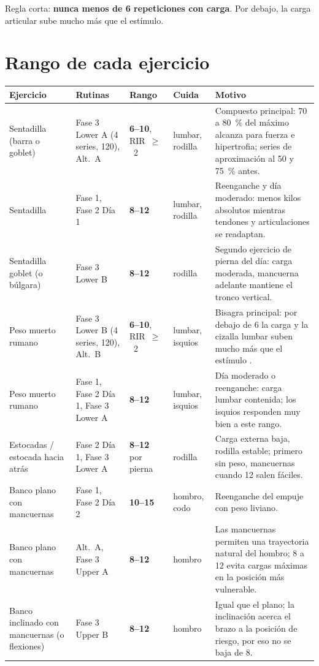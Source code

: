 \documentclass[11pt,a4paper]{article}
\newcommand{\rango}[1]{\textbf{#1}}
\newcommand{\seg}{\textquotedbl}
\begin{document}
Regla corta: \textbf{nunca menos de 6 repeticiones con carga}. Por debajo, la carga articular sube mucho más que el estímulo.

\section{Rango de cada ejercicio}

\begin{longtable}{L{3.0cm} L{3.0cm} L{2.1cm} L{2.0cm} L{4.8cm}}
\toprule
\textbf{Ejercicio} & \textbf{Rutinas} & \textbf{Rango} & \textbf{Cuida} & \textbf{Motivo} \\
\midrule
\endhead
Sentadilla (barra o goblet) & Fase 3 Lower A (4 series, 120\seg), Alt.\ A & \rango{6--10}, RIR~$\geq$~2 & lumbar, rodilla & Compuesto principal: 70 a 80~\% del máximo alcanza para fuerza e hipertrofia; series de aproximación al 50 y 75~\% antes. \\
Sentadilla & Fase 1, Fase 2 Día 1 & \rango{8--12} & lumbar, rodilla & Reenganche y día moderado: menos kilos absolutos mientras tendones y articulaciones se readaptan. \\
Sentadilla goblet (o búlgara) & Fase 3 Lower B & \rango{8--12} & rodilla & Segundo ejercicio de pierna del día: carga moderada, mancuerna adelante mantiene el tronco vertical. \\
Peso muerto rumano & Fase 3 Lower B (4 series, 120\seg), Alt.\ B & \rango{6--10}, RIR~$\geq$~2 & lumbar, isquios & Bisagra principal: por debajo de 6 la carga y la cizalla lumbar suben mucho más que el estímulo \cite{cholewicki1991}. \\
Peso muerto rumano & Fase 1, Fase 2 Día 1, Fase 3 Lower A & \rango{8--12} & lumbar, isquios & Día moderado o reenganche: carga lumbar contenida; los isquios responden muy bien a este rango. \\
Estocadas / estocada hacia atrás & Fase 2 Día 1, Fase 3 Lower A & \rango{8--12} por pierna & rodilla & Carga externa baja, rodilla estable; primero sin peso, mancuernas cuando 12 salen fáciles. \\
Banco plano con mancuernas & Fase 1, Fase 2 Día 2 & \rango{10--15} & hombro, codo & Reenganche del empuje con peso liviano. \\
Banco plano con mancuernas & Alt.\ A, Fase 3 Upper A & \rango{8--12} & hombro & Las mancuernas permiten una trayectoria natural del hombro; 8 a 12 evita cargas máximas en la posición más vulnerable. \\
Banco inclinado con mancuernas (o flexiones) & Fase 3 Upper B & \rango{8--12} & hombro & Igual que el plano; la inclinación acerca el brazo a la posición de riesgo, por eso no se baja de 8. \\

\end{longtable}
\end{document}
